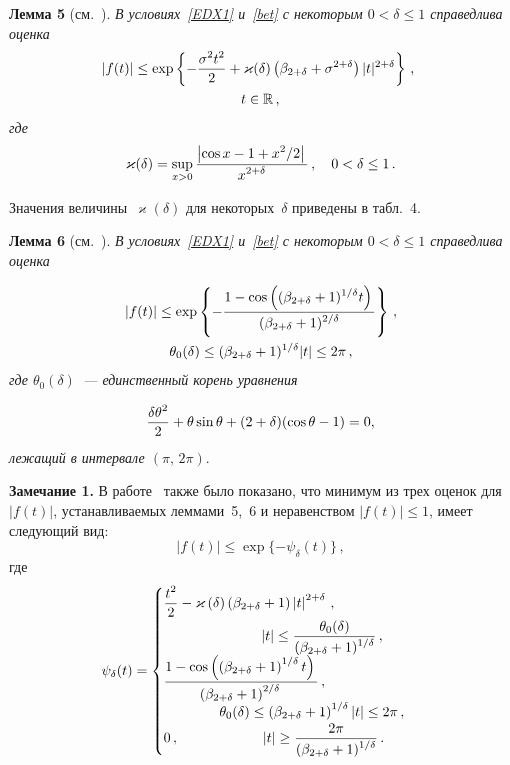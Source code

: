 \begin{multicols}{2}
\smallskip

\noindent
\textbf{Лемма 5} (см.~\cite{Shevtsova2009}). %
\textit{В условиях~\eqref{EDX1} и~\eqref{bet} с некоторым ${0<\delta\le1}$
справедлива оценка}
\begin{multline*}
\!\!|f(t)|\le  \exp\left\{-\displaystyle\frac{\displaystyle \sigma^2t^2\mathstrut}{\displaystyle 2\mathstrut}+
\varkappa(\delta)\left(\beta_{2+\delta}+
\sigma^{2+\delta}\right)|t|^{2+\delta}\right\}\,,\\ t\in\mathbb R\,,
\end{multline*}
\textit{где}
$$
\varkappa(\delta)=\sup_{x>0}\displaystyle\frac{\displaystyle \left|\cos
x-1+x^2/2\right|\mathstrut}{\displaystyle x^{2+\delta}\mathstrut}\,,\quad  0<\delta\le1\,.
$$

\smallskip

Значения величины~$\varkappa(\delta)$ для некоторых~$\delta$ приведены в
табл.~4.

\smallskip
\noindent
\textbf{Лемма 6} (см.~\cite{Shevtsova2009}). %
\textit{В условиях~\eqref{EDX1} и~\eqref{bet} с некоторым ${0<\delta\le1}$
справедлива оценка}

\noindent
\begin{multline*}
|f(t)|\le \exp\left\{-\displaystyle\frac{\displaystyle 1-\cos\left((\beta_{2+\delta}+1)^{1/\delta} t\right)\mathstrut}{\displaystyle (\beta_{2+\delta}+1)^{2/\delta}\mathstrut}\right\}\,,\\
 \theta_0(\delta)\le (\beta_{2+\delta}+1)^{1/\delta}|t|  \le2\pi\,,
\end{multline*}
\textit{где $\theta_0(\delta)$~--- единственный корень уравнения}

\noindent
$$
\displaystyle\frac{\displaystyle \delta\theta^2\mathstrut}{\displaystyle 2\mathstrut}+ \theta\sin \theta + (2+\delta)(\cos \theta - 1)=0,
$$
\textit{лежащий в интервале $(\pi,\,2\pi)$}.


\smallskip

\noindent
\textbf{Замечание 1.}
В работе~\cite{Shevtsova2009} также было показано, что минимум из
трех оценок для~$|f(t)|$, устанавли\-ва\-емых
леммами~5,~6 и неравенством $|f(t)|\le1$, имеет
сле\-ду\-ющий вид:
$$
|f(t)|\le \exp\{-\psi_\delta(t)\}\,,
$$
где
$$
\psi_\delta(t)=
\begin{cases}
\displaystyle\frac{\displaystyle t^2\mathstrut}{\displaystyle 2\mathstrut}-\varkappa\left(\delta\right)\left(\beta_{2+\delta}+
 1\right)\left|t\right|^{2+\delta}\,, \\
\quad\quad\quad\quad\quad\quad\quad  |t|\le\displaystyle\frac{\displaystyle \theta_0(\delta)\mathstrut}{\displaystyle (\beta_{2+\delta}+1)^{1/\delta}\mathstrut}\,, \\[6pt]
\displaystyle\frac{\displaystyle 1-\cos\left(\left(\beta_{2+\delta}+1\right)^{1/\delta}t\right)\mathstrut}{\displaystyle \left(\beta_{2+\delta}+1\right)^{2/\delta}\mathstrut}\,,\\
\quad\quad\quad\quad \theta_0(\delta)\le \left(\beta_{2+\delta}+1\right)^{1/\delta}\left|t\right|  \le2\pi\,, \\
    0\,, \quad\quad\quad\quad\qquad |t|\ge\displaystyle\frac{\displaystyle 2\pi\mathstrut}{\displaystyle (\beta_{2+\delta}+1)^{1/\delta}\mathstrut}\,.
\end{cases}
$$



\end{multicols}
